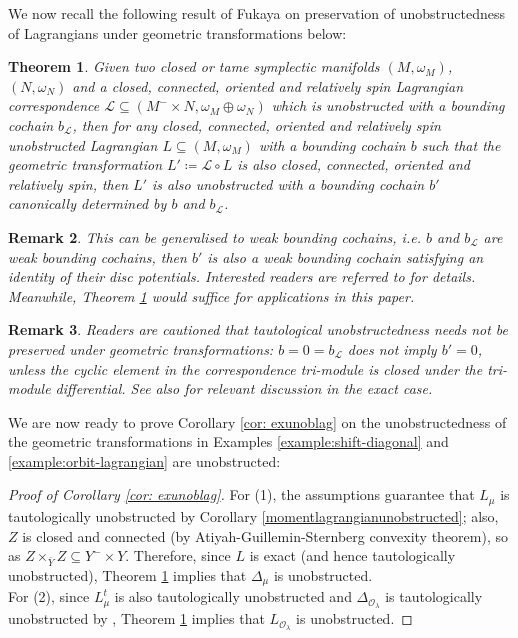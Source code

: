 \documentclass{amsart}
\newtheorem{theorem}{Theorem}[section]
\newtheorem{remark}[theorem]{Remark}
\numberwithin{equation}{section}
\begin{document}
We now recall the following result of Fukaya on preservation of unobstructedness of Lagrangians under geometric transformations below:

\begin{theorem}\cite[Theorem 1.5]{Fukaya-corr} \label{unobstructedness}
Given two closed or tame symplectic manifolds $(M, \omega_M)$,
$(N, \omega_N)$ and a closed, connected, oriented and relatively spin Lagrangian correspondence $\mathcal{L} \subseteq (M^-\times N, \omega_M\oplus \omega_N)$ which is unobstructed with a bounding cochain $b_{\mathcal{L}}$, then for any closed, connected, oriented and relatively spin unobstructed Lagrangian $L \subseteq (M, \omega_M)$ with a bounding cochain $b$ such that the geometric transformation
$L' \coloneqq \mathcal{L} \circ L$ is also closed, connected, oriented and relatively spin, then $L'$ is also unobstructed with a bounding cochain $b'$ canonically determined by $b$ and $b_{\mathcal{L}}$.
\end{theorem}

\begin{remark}
This can be generalised to weak bounding cochains, i.e. $b$ and $b_{\mathcal{L}}$ are weak bounding cochains, then $b'$ is also a weak bounding cochain satisfying an identity of their disc potentials. Interested readers are referred to \cite[Proposition 2.10]{lauleungli} for details. Meanwhile, Theorem \ref{unobstructedness} would suffice for applications in this paper.
\end{remark}

\begin{remark}
    Readers are cautioned that tautological unobstructedness needs not be preserved under geometric transformations: $b = 0 = b_{\mathcal{L}}$ does not imply $b' = 0$, unless the cyclic element in the correspondence tri-module is closed under the tri-module differential. See also \cite[Lemma 7.21]{gao} for relevant discussion in the exact case. 
\end{remark}

We are now ready to prove Corollary \ref{cor: exunoblag} on the unobstructedness of the geometric transformations 
in Examples \ref{example:shift-diagonal} 
and \ref{example:orbit-lagrangian} are unobstructed:

\begin{proof}[Proof of Corollary \ref{cor: exunoblag}]
For (1), the assumptions guarantee that $L_\mu$ is tautologically unobstructed by 
Corollary \ref{momentlagrangianunobstructed}; also, $Z$ is closed and connected 
(by Atiyah-Guillemin-Sternberg convexity theorem), so as $Z \times_{\bar{Y}} Z \subseteq Y^- \times Y$. 
Therefore, since $L$ is exact (and hence tautologically unobstructed), Theorem \ref{unobstructedness} implies that $\Delta_\mu$ is unobstructed.\\

For (2), since $L^t_\mu$ is also tautologically unobstructed and $\Delta_{\mathcal{O}_\lambda}$ is tautologically unobstructed by \cite[Theorem 1.9]{FOOOinvol}, Theorem \ref{unobstructedness} implies that $L_{\mathcal{O}_\lambda}$ is unobstructed.
\end{proof}
\end{document}
